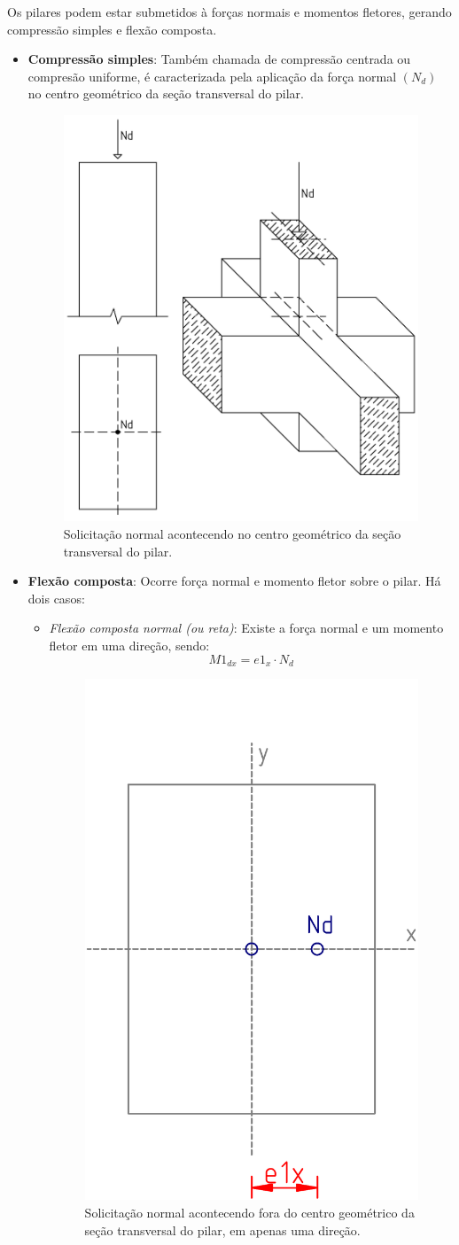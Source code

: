 Os pilares podem estar submetidos à forças normais e momentos fletores, gerando compressão simples e flexão composta.

\begin{itemize}

	\item \textbf{Compressão simples}: Também chamada de compressão centrada ou compresão uniforme, é caracterizada pela aplicação da força normal $(N_d)$ no centro geométrico da seção transversal do pilar.

		\begin{figure}[H]
			\begin{center}
				\caption{Solicitação normal acontecendo no centro geométrico da seção transversal do pilar.}    	
				\includegraphics[height=0.5\textwidth]{Solicitacoes-normais/Imagens/Compressao-simples.png}
			\end{center}
		\end{figure}

	\item \textbf{Flexão composta}: Ocorre força normal e momento fletor sobre o pilar. Há dois casos:

		\begin{itemize}
     			\item \textit{Flexão composta normal (ou reta)}: Existe a força normal e um momento fletor em uma direção, sendo:
				$$M1_{dx}=e1_x\cdot N_d$$

				\begin{figure}[H]
					\begin{center}
						\caption{Solicitação normal acontecendo fora do centro geométrico da seção transversal do pilar, em apenas uma direção.}    	
						\includegraphics[height=0.4\textwidth]{Solicitacoes-normais/Imagens/Flexao-composta-normal.png}
					\end{center}
				\end{figure}
				

\end{itemize}
\end{itemize}
